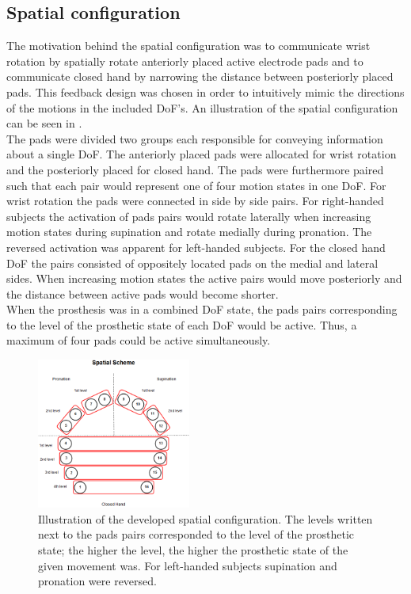 \subsection{Spatial configuration}
The motivation behind the spatial configuration was to communicate wrist rotation by spatially rotate anteriorly placed active electrode pads and to communicate closed hand by narrowing the distance between posteriorly placed pads. This feedback design was chosen in order to intuitively mimic the directions of the motions in the included DoF's. An illustration of the spatial configuration can be seen in . \\
The pads were divided two groups each responsible for conveying information about a single DoF. The anteriorly placed pads were allocated for wrist rotation and the posteriorly placed for closed hand. The pads were furthermore paired such that each pair would represent one of four motion states in one DoF. For wrist rotation the pads were connected in side by side pairs. For right-handed subjects the activation of pads pairs would rotate laterally when increasing motion states during supination and rotate medially during pronation. The reversed activation was apparent for left-handed subjects. For the closed hand DoF the pairs consisted of oppositely located pads on the medial and lateral sides. When increasing motion states the active pairs would move posteriorly and the distance between active pads would become shorter. \\
When the prosthesis was in a combined DoF state, the pads pairs corresponding to the level of the prosthetic state of each DoF would be active. Thus, a maximum of four pads could be active simultaneously. 

\begin{figure}[H]                 
	\includegraphics[width=0.45\textwidth]{figures/El_array_spatial}  
	\caption{Illustration of the developed spatial configuration. The levels written next to the pads pairs corresponded to the level of the prosthetic state; the higher the level, the higher the prosthetic state of the given movement was. For left-handed subjects supination and pronation were reversed.}
	\label{fig:pa:spatial} 
\end{figure}

